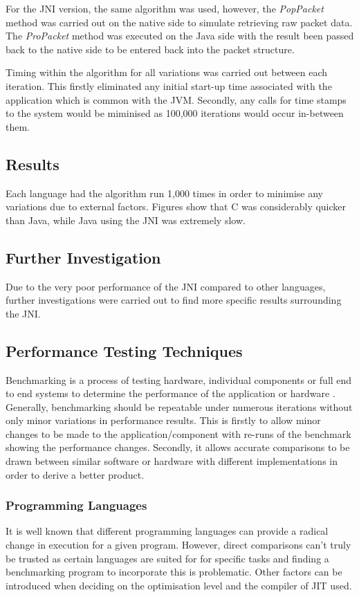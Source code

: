 \documentclass[final_report.tex]{subfiles}
\begin{document}
For the JNI version, the same algorithm was used, however, the \textit{PopPacket} method was carried out on the native side to simulate retrieving raw packet data. The \textit{ProPacket} method was executed on the Java side with the result been passed back to the native side to be entered back into the packet structure.

Timing within the algorithm for all variations was carried out between each iteration. This firstly eliminated any initial start-up time associated with the application which is common with the JVM. Secondly, any calls for time stamps to the system would be miminised as 100,000 iterations would occur in-between them.

\subsection{Results}
Each language had the algorithm run 1,000 times in order to minimise any variations due to external factors. Figures  show that C was considerably quicker than Java, while Java using the JNI was extremely slow. 

\subsection{Further Investigation}
Due to the very poor performance of the JNI compared to other languages, further investigations were carried out to find more specific results surrounding the JNI.

\subsection{Performance Testing Techniques}
Benchmarking is a process of testing hardware, individual components or full end to end systems to determine the performance of the application or hardware . Generally, benchmarking should be repeatable under numerous iterations without only minor variations in performance results. This is firstly to allow minor changes to be made to the application/component with re-runs of the benchmark showing the performance changes. Secondly, it allows accurate comparisons to be drawn between similar software or hardware with different implementations in order to derive  a better product.


\subsubsection{Programming Languages}
It is well known that different programming languages can provide a radical change in execution for a given program. However, direct comparisons can't truly be trusted as certain languages are suited for for specific tasks and finding a benchmarking program to incorporate this is problematic. Other factors can be introduced when deciding on the optimisation level  and the compiler of JIT used. 
\end{document}

